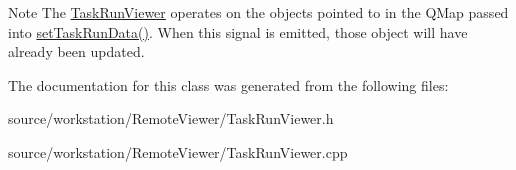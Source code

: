 \begin{DoxyNote}{Note}
The \hyperlink{class_task_run_viewer}{Task\-Run\-Viewer} operates on the objects pointed to in the Q\-Map passed into \hyperlink{class_task_run_viewer_ac2204abac526043c4262951ca1853838}{set\-Task\-Run\-Data()}. When this signal is emitted, those object will have already been updated. 
\end{DoxyNote}


The documentation for this class was generated from the following files\-:\begin{DoxyCompactItemize}
\item 
source/workstation/\-Remote\-Viewer/Task\-Run\-Viewer.\-h\item 
source/workstation/\-Remote\-Viewer/Task\-Run\-Viewer.\-cpp\end{DoxyCompactItemize}
